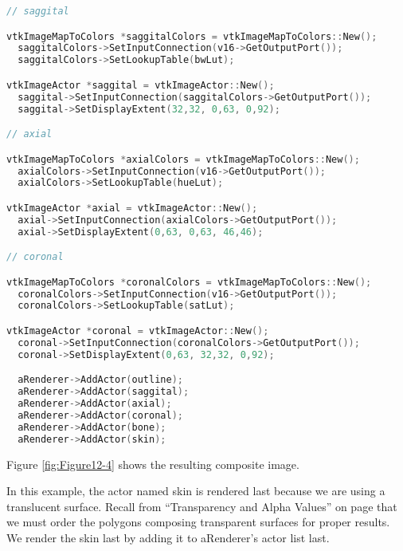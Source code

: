 \begin{lstlisting}[language=C++, caption={Mapping the image data and displaying the image slices.}]
// saggital

vtkImageMapToColors *saggitalColors = vtkImageMapToColors::New();
  saggitalColors->SetInputConnection(v16->GetOutputPort());
  saggitalColors->SetLookupTable(bwLut);

vtkImageActor *saggital = vtkImageActor::New();
  saggital->SetInputConnection(saggitalColors->GetOutputPort());
  saggital->SetDisplayExtent(32,32, 0,63, 0,92);

// axial

vtkImageMapToColors *axialColors = vtkImageMapToColors::New();
  axialColors->SetInputConnection(v16->GetOutputPort());
  axialColors->SetLookupTable(hueLut);

vtkImageActor *axial = vtkImageActor::New();
  axial->SetInputConnection(axialColors->GetOutputPort());
  axial->SetDisplayExtent(0,63, 0,63, 46,46);

// coronal

vtkImageMapToColors *coronalColors = vtkImageMapToColors::New();
  coronalColors->SetInputConnection(v16->GetOutputPort());
  coronalColors->SetLookupTable(satLut);

vtkImageActor *coronal = vtkImageActor::New();
  coronal->SetInputConnection(coronalColors->GetOutputPort());
  coronal->SetDisplayExtent(0,63, 32,32, 0,92);

  aRenderer->AddActor(outline);
  aRenderer->AddActor(saggital);
  aRenderer->AddActor(axial);
  aRenderer->AddActor(coronal);
  aRenderer->AddActor(bone);
  aRenderer->AddActor(skin);
\end{lstlisting}

Figure \ref{fig:Figure12-4} shows the resulting composite image.

In this example, the actor named skin is rendered last because we are using a translucent surface. Recall from ``Transparency and Alpha Values'' on page \pageref{sec:transparency_alpha} that we must order the polygons  composing transparent surfaces for proper results. We render the skin last by adding it to aRenderer's actor list last.

